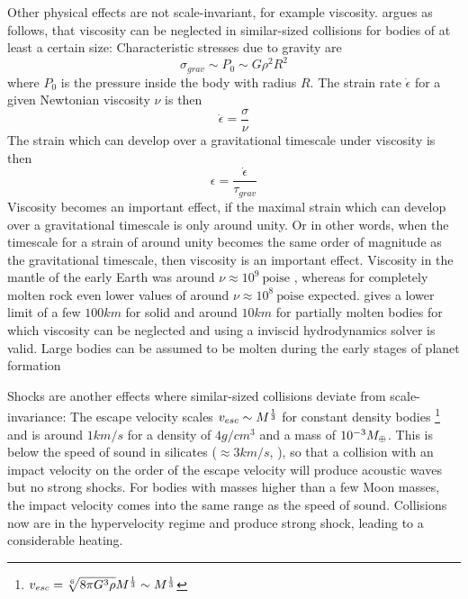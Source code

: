 Other physical effects are not scale-invariant, for example viscosity. \cite{Asphaug:2010p3539} argues as follows, that viscosity can be neglected in similar-sized collisions for bodies of at least a certain size: Characteristic stresses due to gravity are 
\begin{equation}
\sigma_{grav} \sim P_0 \sim G \rho^2 R^2
\end{equation}
where $P_0$ is the pressure inside the body with radius $R$. The strain rate $\dot{\epsilon}$ for a given Newtonian viscosity $\nu$ is then
\begin{equation}
\dot{\epsilon} = \frac{\sigma}{\nu}
\end{equation}
The strain which can develop over a gravitational timescale under viscosity is then
\begin{equation}
\epsilon = \frac{\dot{\epsilon}}{\tau_{grav}}
\end{equation}
Viscosity becomes an important effect, if the maximal strain which can develop over a gravitational timescale is only around unity. Or in other words, when the timescale for a strain of around unity becomes the same order of magnitude as the gravitational timescale, then viscosity is an important effect. Viscosity in the mantle of the early Earth was around $\nu \approx 10^9~\textrm{poise}$ \citep{2004Tectp.384...55W}, whereas for completely molten rock even lower values of around $\nu \approx 10^8~\textrm{poise}$ expected. \cite{Asphaug:2010p3539} gives a lower limit of a few $100km$ for solid and around $10km$ for partially molten bodies for which viscosity can be neglected and using a inviscid hydrodynamics solver is valid. Large bodies can be assumed to be molten during the early stages of planet formation 

Shocks are another effects where similar-sized collisions deviate from scale-invariance: The escape velocity scales $v_{esc} \sim M^\frac{1}{3}$ for constant density bodies \footnote{$v_{esc} = \sqrt[6]{8 \pi G^3 \rho} M^\frac{1}{3} \sim M^\frac{1}{3}$} and is around $1km/s$ for a density of $4g/cm^3$ and a mass of $10^{-3} M_{\oplus}$. This is below the speed of sound in silicates ($\approx 3 km/s$, \cite{Melosh:2007p3502}), so that a collision with an impact velocity on the order of the escape velocity will produce acoustic waves but no strong shocks. For bodies with masses higher than a few Moon masses, the impact velocity comes into the same range as the speed of sound. Collisions now are in the hypervelocity regime and produce strong shock, leading to a considerable heating. 

